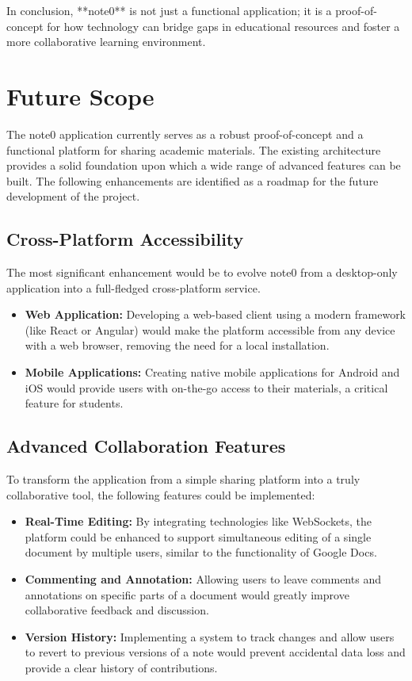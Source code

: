 \documentclass[12pt, a4paper]{report}
\begin{document}
\begin{itemize}
In conclusion, **note0** is not just a functional application; it is a proof-of-concept for how technology can bridge gaps in educational resources and foster a more collaborative learning environment.


\section{Future Scope}
The note0 application currently serves as a robust proof-of-concept and a functional platform for sharing academic materials. The existing architecture provides a solid foundation upon which a wide range of advanced features can be built. The following enhancements are identified as a roadmap for the future development of the project.

\subsection{Cross-Platform Accessibility}
The most significant enhancement would be to evolve note0 from a desktop-only application into a full-fledged cross-platform service.
\begin{itemize}
    \item \textbf{Web Application:} Developing a web-based client using a modern framework (like React or Angular) would make the platform accessible from any device with a web browser, removing the need for a local installation.
    \item \textbf{Mobile Applications:} Creating native mobile applications for Android and iOS would provide users with on-the-go access to their materials, a critical feature for students.
\end{itemize}

\subsection{Advanced Collaboration Features}
To transform the application from a simple sharing platform into a truly collaborative tool, the following features could be implemented:
\begin{itemize}
    \item \textbf{Real-Time Editing:} By integrating technologies like WebSockets, the platform could be enhanced to support simultaneous editing of a single document by multiple users, similar to the functionality of Google Docs.
    \item \textbf{Commenting and Annotation:} Allowing users to leave comments and annotations on specific parts of a document would greatly improve collaborative feedback and discussion.
    \item \textbf{Version History:} Implementing a system to track changes and allow users to revert to previous versions of a note would prevent accidental data loss and provide a clear history of contributions.
\end{itemize}


\end{itemize}
\end{document}
